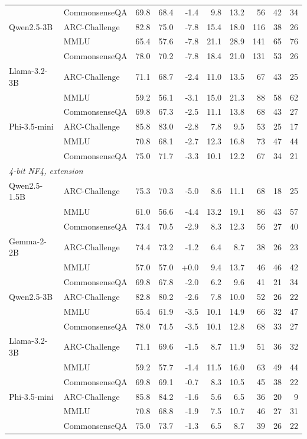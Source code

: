 \begin{tabular}{llrrrrrrrr}
 & CommonsenseQA & 69.8 & 68.4 & -1.4 & 9.8 & 13.2 & 56 & 42 & 34 \\
Qwen2.5-3B & ARC-Challenge & 82.8 & 75.0 & -7.8 & 15.4 & 18.0 & 116 & 38 & 26 \\
 & MMLU & 65.4 & 57.6 & -7.8 & 21.1 & 28.9 & 141 & 65 & 76 \\
 & CommonsenseQA & 78.0 & 70.2 & -7.8 & 18.4 & 21.0 & 131 & 53 & 26 \\
Llama-3.2-3B & ARC-Challenge & 71.1 & 68.7 & -2.4 & 11.0 & 13.5 & 67 & 43 & 25 \\
 & MMLU & 59.2 & 56.1 & -3.1 & 15.0 & 21.3 & 88 & 58 & 62 \\
 & CommonsenseQA & 69.8 & 67.3 & -2.5 & 11.1 & 13.8 & 68 & 43 & 27 \\
Phi-3.5-mini & ARC-Challenge & 85.8 & 83.0 & -2.8 & 7.8 & 9.5 & 53 & 25 & 17 \\
 & MMLU & 70.8 & 68.1 & -2.7 & 12.3 & 16.8 & 73 & 47 & 44 \\
 & CommonsenseQA & 75.0 & 71.7 & -3.3 & 10.1 & 12.2 & 67 & 34 & 21 \\
\midrule
\multicolumn{10}{l}{\emph{4-bit NF4, extension}} \\
Qwen2.5-1.5B & ARC-Challenge & 75.3 & 70.3 & -5.0 & 8.6 & 11.1 & 68 & 18 & 25 \\
 & MMLU & 61.0 & 56.6 & -4.4 & 13.2 & 19.1 & 86 & 43 & 57 \\
 & CommonsenseQA & 73.4 & 70.5 & -2.9 & 8.3 & 12.3 & 56 & 27 & 40 \\
Gemma-2-2B & ARC-Challenge & 74.4 & 73.2 & -1.2 & 6.4 & 8.7 & 38 & 26 & 23 \\
 & MMLU & 57.0 & 57.0 & +0.0 & 9.4 & 13.7 & 46 & 46 & 42 \\
 & CommonsenseQA & 69.8 & 67.8 & -2.0 & 6.2 & 9.6 & 41 & 21 & 34 \\
Qwen2.5-3B & ARC-Challenge & 82.8 & 80.2 & -2.6 & 7.8 & 10.0 & 52 & 26 & 22 \\
 & MMLU & 65.4 & 61.9 & -3.5 & 10.1 & 14.9 & 66 & 32 & 47 \\
 & CommonsenseQA & 78.0 & 74.5 & -3.5 & 10.1 & 12.8 & 68 & 33 & 27 \\
Llama-3.2-3B & ARC-Challenge & 71.1 & 69.6 & -1.5 & 8.7 & 11.9 & 51 & 36 & 32 \\
 & MMLU & 59.2 & 57.7 & -1.4 & 11.5 & 16.0 & 63 & 49 & 44 \\
 & CommonsenseQA & 69.8 & 69.1 & -0.7 & 8.3 & 10.5 & 45 & 38 & 22 \\
Phi-3.5-mini & ARC-Challenge & 85.8 & 84.2 & -1.6 & 5.6 & 6.5 & 36 & 20 & 9 \\
 & MMLU & 70.8 & 68.8 & -1.9 & 7.5 & 10.7 & 46 & 27 & 31 \\
 & CommonsenseQA & 75.0 & 73.7 & -1.3 & 6.5 & 8.7 & 39 & 26 & 22 \\
\bottomrule
\end{tabular}